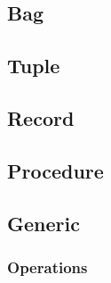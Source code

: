 \subsection{Bag}
\subsection{Tuple}
\subsection{Record}
\subsection{Procedure}
\subsection{Generic}
\subsubsection{Operations}
